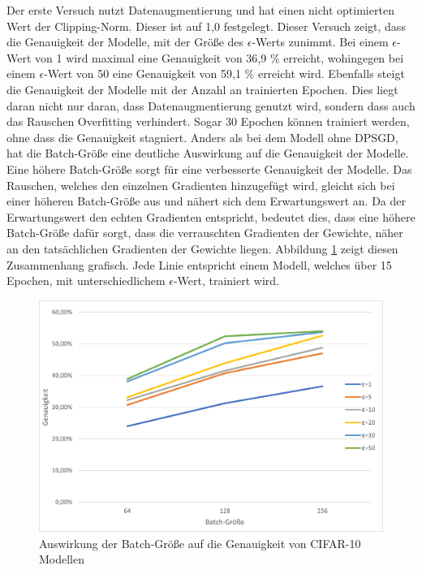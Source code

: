 Der erste Versuch nutzt Datenaugmentierung und hat einen nicht optimierten Wert der Clipping-Norm.
Dieser ist auf 1,0 festgelegt.
Dieser Versuch zeigt, dass die Genauigkeit der Modelle, mit der Größe des $\epsilon$-Werts zunimmt.
Bei einem $\epsilon$-Wert von 1 wird maximal eine Genauigkeit von 36,9 \% erreicht, wohingegen bei einem $\epsilon$-Wert von 50 eine Genauigkeit von 59,1 \% erreicht wird.
Ebenfalls steigt die Genauigkeit der Modelle mit der Anzahl an trainierten Epochen. 
Dies liegt daran nicht nur daran, dass Datenaugmentierung genutzt wird, sondern dass auch das Rauschen Overfitting verhindert.
Sogar 30 Epochen können trainiert werden, ohne dass die Genauigkeit stagniert.
Anders als bei dem Modell ohne DPSGD, hat die Batch-Größe eine deutliche Auswirkung auf die Genauigkeit der Modelle.
Eine höhere Batch-Größe sorgt für eine verbesserte Genauigkeit der Modelle.
Das Rauschen, welches den einzelnen Gradienten hinzugefügt wird, gleicht sich bei einer höheren Batch-Größe aus und nähert sich dem Erwartungswert an. 
Da der Erwartungswert den echten Gradienten entspricht, bedeutet dies, dass eine höhere Batch-Größe dafür sorgt, dass die verrauschten Gradienten der Gewichte, näher an den tatsächlichen Gradienten der Gewichte liegen.
Abbildung \ref{fig:cifar-2} zeigt diesen Zusammenhang grafisch.
Jede Linie entspricht einem Modell, welches über 15 Epochen, mit unterschiedlichem $\epsilon$-Wert, trainiert wird.
\begin{figure}[!htb]
    \centering
    \includegraphics[width=14cm]{figures/results_cifar/cifar_batch_1.png}
    \caption{Auswirkung der Batch-Größe auf die Genauigkeit von CIFAR-10 Modellen}
    \label{fig:cifar-2}
\end{figure} 


